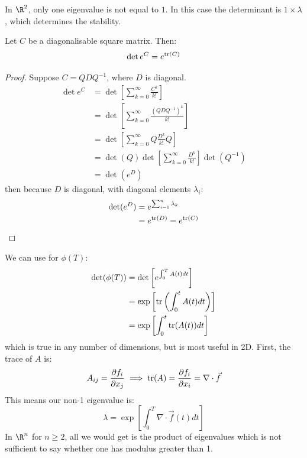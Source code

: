 \documentclass[../Main.tex]{subfiles}
\begin{document}
In $\R^2$, only one eigenvalue is not equal to $1$. In this case the determinant is $1 \times \lambda$, which determines the stability.
\begin{proposition}
    Let $C$ be a diagonalisable square matrix. Then:
    \begin{equation*}
        \det{e^C} = e^{\operatorname{tr}(C)}
    \end{equation*}
    \label{propDetDiag}
\end{proposition}
\begin{proof}
    Suppose $C = QDQ^{-1}$, where $D$ is diagonal.
    \begin{align*}
        \det{e^C} &= \det \left[\sum_{k=0}^{\infty} \frac{C^k}{k!}\right] \\
        &= \det\left[\sum_{k=0}^{\infty} \frac{(QDQ^{-1})^k}{k!}\right] \\
        &= \det\left[\sum_{k=0}^{\infty} Q\frac{D^k}{k!}Q\right] \\
        &= \det(Q)\det\left[\sum_{k=0}^{\infty} \frac{D^k}{k!}\right] \det(Q^{-1}) \\
        &= \det(e^D)
    \end{align*}
    then because $D$ is diagonal, with diagonal elements $\lambda_i$:
    \begin{align*}
        \det(e^D) &= e^{\sum_{i=1}^{n}\lambda_k} \\
        &= e^{\operatorname{tr}(D)} = e^{\operatorname{tr}(C)}
    \end{align*}
\end{proof}
We can use  for $\phi(T)$:
\begin{align*}
    \det(\phi(T)) &= \det \left[e^{\int_{0}^{T} A(t) dt}\right] \\
    &= \exp\left[\operatorname{tr}\left(\int_{0}^{t} A(t) dt \right)\right] \\
    &= \exp\left[\int_{0}^{t} \operatorname{tr}(A(t)) dt\right]
\end{align*}
which is true in any number of dimensions, but is most useful in 2D. First, the trace of $A$ is:
\begin{equation*}
    A_{ij} = \frac{\partial f_i}{\partial x_j} \implies \operatorname{tr}(A) = \frac{\partial f_i}{\partial x_i} = \nabla \cdot \vec{f}
\end{equation*}
This means our non-1 eigenvalue is:
\begin{equation*}
    \lambda = \exp\left[\int_{0}^{T} \nabla \cdot \vec{f}(t) dt\right]
\end{equation*}
In $\R^n$ for $n \geq 2$, all we would get is the product of eigenvalues which is not sufficient to say whether one has modulus greater than 1.
\end{document}
